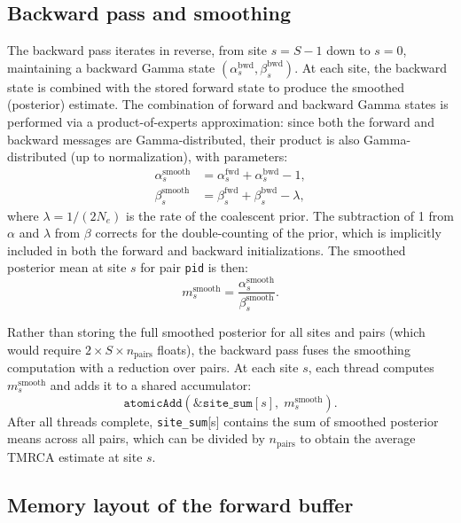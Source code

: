 \documentclass[10pt,letterpaper]{article}
\begin{document}
\subsection{Backward pass and smoothing}

The backward pass iterates in reverse, from site $s = S-1$ down to $s = 0$, maintaining a backward Gamma state $(\alpha^{\mathrm{bwd}}_s, \beta^{\mathrm{bwd}}_s)$. At each site, the backward state is combined with the stored forward state to produce the smoothed (posterior) estimate. The combination of forward and backward Gamma states is performed via a product-of-experts approximation: since both the forward and backward messages are Gamma-distributed, their product is also Gamma-distributed (up to normalization), with parameters:
\begin{align}
\alpha^{\mathrm{smooth}}_s &= \alpha^{\mathrm{fwd}}_s + \alpha^{\mathrm{bwd}}_s - 1, \label{eq:smooth_alpha} \\
\beta^{\mathrm{smooth}}_s &= \beta^{\mathrm{fwd}}_s + \beta^{\mathrm{bwd}}_s - \lambda, \label{eq:smooth_beta}
\end{align}
where $\lambda = 1/(2N_e)$ is the rate of the coalescent prior. The subtraction of 1 from $\alpha$ and $\lambda$ from $\beta$ corrects for the double-counting of the prior, which is implicitly included in both the forward and backward initializations. The smoothed posterior mean at site $s$ for pair \texttt{pid} is then:
\begin{equation}
m^{\mathrm{smooth}}_s = \frac{\alpha^{\mathrm{smooth}}_s}{\beta^{\mathrm{smooth}}_s}.
\end{equation}

Rather than storing the full smoothed posterior for all sites and pairs (which would require $2 \times S \times n_{\mathrm{pairs}}$ floats), the backward pass fuses the smoothing computation with a reduction over pairs. At each site $s$, each thread computes $m^{\mathrm{smooth}}_s$ and adds it to a shared accumulator:
\begin{equation}
\texttt{atomicAdd}(\&\texttt{site\_sum}[s],\; m^{\mathrm{smooth}}_s).
\end{equation}
After all threads complete, \texttt{site\_sum}[s] contains the sum of smoothed posterior means across all pairs, which can be divided by $n_{\mathrm{pairs}}$ to obtain the average TMRCA estimate at site $s$.

\subsection{Memory layout of the forward buffer}
\end{document}
